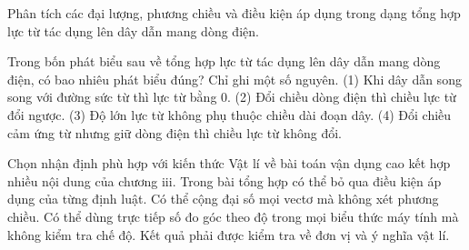 \begin{bt}
Phân tích các đại lượng, phương chiều và điều kiện áp dụng trong dạng tổng hợp lực từ tác dụng lên dây dẫn mang dòng điện.
\end{bt}

\begin{ex}
Trong bốn phát biểu sau về tổng hợp lực từ tác dụng lên dây dẫn mang dòng điện, có bao nhiêu phát biểu đúng? Chỉ ghi một số nguyên. (1) Khi dây dẫn song song với đường sức từ thì lực từ bằng 0. (2) Đổi chiều dòng điện thì chiều lực từ đổi ngược. (3) Độ lớn lực từ không phụ thuộc chiều dài đoạn dây. (4) Đổi chiều cảm ứng từ nhưng giữ dòng điện thì chiều lực từ không đổi.
\end{ex}

\begin{ex}
Chọn nhận định phù hợp với kiến thức Vật lí về bài toán vận dụng cao kết hợp nhiều nội dung của chương iii.
\choice
{Trong bài tổng hợp có thể bỏ qua điều kiện áp dụng của từng định luật.}
{Có thể cộng đại số mọi vectơ mà không xét phương chiều.}
{Có thể dùng trực tiếp số đo góc theo độ trong mọi biểu thức máy tính mà không kiểm tra chế độ.}
{\True Kết quả phải được kiểm tra về đơn vị và ý nghĩa vật lí.}
\end{ex}

